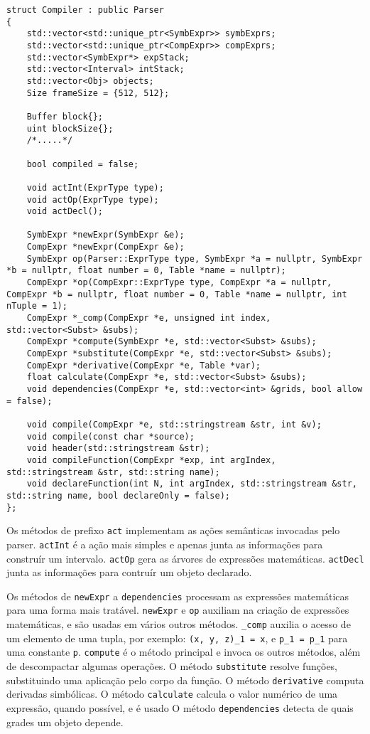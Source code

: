 \begin{lstlisting}[caption=Estrutura parcial do compilador, label=compiler]
struct Compiler : public Parser
{
    std::vector<std::unique_ptr<SymbExpr>> symbExprs;
    std::vector<std::unique_ptr<CompExpr>> compExprs;
    std::vector<SymbExpr*> expStack;
    std::vector<Interval> intStack;
    std::vector<Obj> objects;
    Size frameSize = {512, 512};

    Buffer block{};
    uint blockSize{};
    /*.....*/

    bool compiled = false;

    void actInt(ExprType type);
    void actOp(ExprType type);
    void actDecl();
    
    SymbExpr *newExpr(SymbExpr &e);
    CompExpr *newExpr(CompExpr &e);
    SymbExpr op(Parser::ExprType type, SymbExpr *a = nullptr, SymbExpr *b = nullptr, float number = 0, Table *name = nullptr);
    CompExpr *op(CompExpr::ExprType type, CompExpr *a = nullptr, CompExpr *b = nullptr, float number = 0, Table *name = nullptr, int nTuple = 1);
    CompExpr *_comp(CompExpr *e, unsigned int index, std::vector<Subst> &subs);
    CompExpr *compute(SymbExpr *e, std::vector<Subst> &subs);
    CompExpr *substitute(CompExpr *e, std::vector<Subst> &subs);
    CompExpr *derivative(CompExpr *e, Table *var);
    float calculate(CompExpr *e, std::vector<Subst> &subs);
    void dependencies(CompExpr *e, std::vector<int> &grids, bool allow = false);

    void compile(CompExpr *e, std::stringstream &str, int &v);
    void compile(const char *source);
    void header(std::stringstream &str);
    void compileFunction(CompExpr *exp, int argIndex, std::stringstream &str, std::string name);
    void declareFunction(int N, int argIndex, std::stringstream &str, std::string name, bool declareOnly = false);
};
\end{lstlisting}

Os métodos de prefixo \texttt{act} implementam as
ações semânticas invocadas pelo parser.
\texttt{actInt} é a ação mais simples e apenas junta as informações
para construír um intervalo.
\texttt{actOp} gera as árvores de expressões matemáticas.
\texttt{actDecl} junta as informações para contruír um objeto declarado.

Os métodos de \texttt{newExpr} a \texttt{dependencies} processam
as expressões matemáticas para uma forma mais tratável.
\texttt{newExpr} e \texttt{op} auxiliam na criação de expressões matemáticas, e são usadas
em vários outros métodos.
\texttt{\_comp} auxilia o acesso de um elemento de uma tupla, por exemplo:
\texttt{(x, y, z)\_1 = x}, e \texttt{p\_1 = p\_1} para uma constante \texttt{p}.
\texttt{compute} é o método principal e invoca os outros métodos, além de
descompactar algumas operações.
O método \texttt{substitute} resolve funções, substituindo uma aplicação pelo corpo da função.
O método \texttt{derivative} computa derivadas simbólicas.
O método \texttt{calculate} calcula o valor numérico de uma expressão, 
quando possível, e é usado 
O método \texttt{dependencies} detecta de quais grades um objeto depende.

